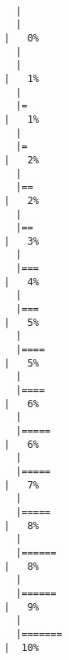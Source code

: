 \documentclass[
  letterpaper,
]{book}
\begin{document}
\begin{verbatim}

  |                                                                            
  |                                                                      |   0%
  |                                                                            
  |                                                                      |   1%
  |                                                                            
  |=                                                                     |   1%
  |                                                                            
  |=                                                                     |   2%
  |                                                                            
  |==                                                                    |   2%
  |                                                                            
  |==                                                                    |   3%
  |                                                                            
  |===                                                                   |   4%
  |                                                                            
  |===                                                                   |   5%
  |                                                                            
  |====                                                                  |   5%
  |                                                                            
  |====                                                                  |   6%
  |                                                                            
  |=====                                                                 |   6%
  |                                                                            
  |=====                                                                 |   7%
  |                                                                            
  |=====                                                                 |   8%
  |                                                                            
  |======                                                                |   8%
  |                                                                            
  |======                                                                |   9%
  |                                                                            
  |=======                                                               |  10%

\end{verbatim}
\end{document}
